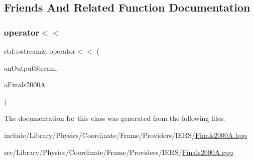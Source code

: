 \subsection{Friends And Related Function Documentation}
\mbox{\label{classlibrary_1_1physics_1_1coord_1_1frame_1_1provider_1_1iers_1_1_finals2000_a_ade92763eb1cb719a4a499af1beb72b43}} 
\subsubsection{\texorpdfstring{operator$<$$<$}{operator<<}}
{\footnotesize\ttfamily std\+::ostream\& operator$<$$<$ (\begin{DoxyParamCaption}\item[{std\+::ostream \&}]{an\+Output\+Stream,  }\item[{const \hyperlink{classlibrary_1_1physics_1_1coord_1_1frame_1_1provider_1_1iers_1_1_finals2000_a}{Finals2000A} \&}]{a\+Finals2000A }\end{DoxyParamCaption})\hspace{0.3cm}{\ttfamily [friend]}}



The documentation for this class was generated from the following files\+:\begin{DoxyCompactItemize}
\item 
include/\+Library/\+Physics/\+Coordinate/\+Frame/\+Providers/\+I\+E\+R\+S/\hyperlink{_finals2000_a_8hpp}{Finals2000\+A.\+hpp}\item 
src/\+Library/\+Physics/\+Coordinate/\+Frame/\+Providers/\+I\+E\+R\+S/\hyperlink{_finals2000_a_8cpp}{Finals2000\+A.\+cpp}\end{DoxyCompactItemize}

